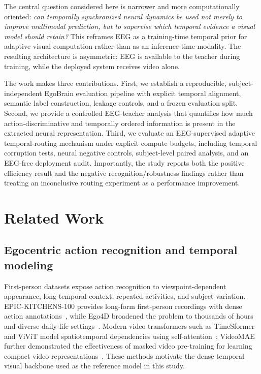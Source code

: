 \documentclass[runningheads]{llncs}
\begin{document}
The central question considered here is narrower and more computationally oriented: \emph{can temporally synchronized neural dynamics be used not merely to improve multimodal prediction, but to supervise which temporal evidence a visual model should retain?} This reframes EEG as a training-time temporal prior for adaptive visual computation rather than as an inference-time modality. The resulting architecture is asymmetric: EEG is available to the teacher during training, while the deployed system receives video alone.

The work makes three contributions. First, we establish a reproducible, subject-independent EgoBrain evaluation pipeline with explicit temporal alignment, semantic label construction, leakage controls, and a frozen evaluation split. Second, we provide a controlled EEG-teacher analysis that quantifies how much action-discriminative and temporally ordered information is present in the extracted neural representation. Third, we evaluate an EEG-supervised adaptive temporal-routing mechanism under explicit compute budgets, including temporal corruption tests, neural negative controls, subject-level paired analysis, and an EEG-free deployment audit. Importantly, the study reports both the positive efficiency result and the negative recognition/robustness findings rather than treating an inconclusive routing experiment as a performance improvement.

\section{Related Work}

\subsection{Egocentric action recognition and temporal modeling}

First-person datasets expose action recognition to viewpoint-dependent appearance, long temporal context, repeated activities, and subject variation. EPIC-KITCHENS-100 provides long-form first-person recordings with dense action annotations~\cite{damen2022epickitchens}, while Ego4D broadened the problem to thousands of hours and diverse daily-life settings~\cite{grauman2022ego4d}. Modern video transformers such as TimeSformer and ViViT model spatiotemporal dependencies using self-attention~\cite{bertasius2021timesformer,arnab2021vivit}; VideoMAE further demonstrated the effectiveness of masked video pre-training for learning compact video representations~\cite{tong2022videomae}. These methods motivate the dense temporal visual backbone used as the reference model in this study.
\end{document}
